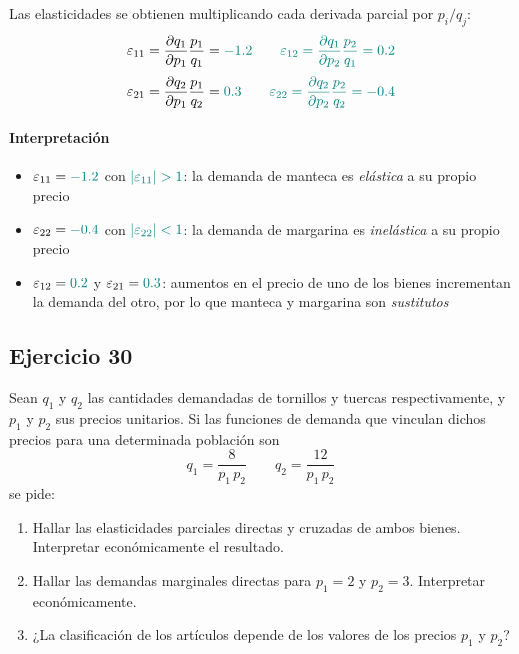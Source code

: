\documentclass{article}
\begin{document}
Las elasticidades se obtienen multiplicando cada derivada parcial por \(p_i/q_j\):
\[
\varepsilon_{11}
=\frac{\partial q_1}{\partial p_1}\frac{p_1}{q_1}
=\color{teal} -1.2
\qquad
\varepsilon_{12}
=\frac{\partial q_1}{\partial p_2}\frac{p_2}{q_1}
=\color{teal} 0.2
\]
\[
\varepsilon_{21}
=\frac{\partial q_2}{\partial p_1}\frac{p_1}{q_2}
=\color{teal} 0.3
\qquad
\varepsilon_{22}
=\frac{\partial q_2}{\partial p_2}\frac{p_2}{q_2}
=\color{teal} -0.4
\]

\paragraph{Interpretación}
\begin{itemize}
  \item \(\varepsilon_{11}=\color{teal} -1.2\) con \(\color{teal} \lvert\varepsilon_{11}\rvert>1\): la demanda de manteca es \emph{elástica} a su propio precio
  \item \(\varepsilon_{22}=\color{teal} -0.4\) con \(\color{teal} \lvert\varepsilon_{22}\rvert<1\): la demanda de margarina es \emph{inelástica} a su propio precio
  \item \(\varepsilon_{12}=\color{teal} 0.2\) y \(\varepsilon_{21}=\color{teal} 0.3\): aumentos en el precio de uno de los bienes incrementan la demanda del otro, por lo que manteca y margarina son \emph{\color{teal}sustitutos}
\end{itemize}




\newpage

\subsection{Ejercicio 30}

Sean \(q_1\) y \(q_2\) las cantidades demandadas de tornillos y tuercas respectivamente, y \(p_1\) y \(p_2\) sus precios unitarios. Si las funciones de demanda que vinculan dichos precios para una determinada población son
\[
q_1 = \frac{8}{p_1\,p_2}
\qquad
q_2 = \frac{12}{p_1\,p_2}
\]
se pide:
\begin{enumerate}
  \item Hallar las elasticidades parciales directas y cruzadas de ambos bienes. Interpretar económicamente el resultado.
  \item Hallar las demandas marginales directas para \(p_1=2\) y \(p_2=3\). Interpretar económicamente.
  \item ¿La clasificación de los artículos depende de los valores de los precios \(p_1\) y \(p_2\)?
\end{enumerate}
\end{document}
